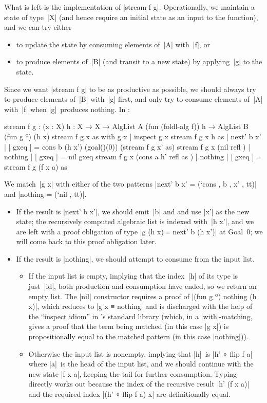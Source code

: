 What is left is the implementation of |stream f g|.
Operationally, we maintain a state of type~|X| (and hence require an initial state as an input to the function), and we can try either
\begin{itemize}
\item to update the state by consuming elements of~|A| with~|f|, or
\item to produce elements of~|B| (and transit to a new state) by applying~|g| to the state.
\end{itemize}
Since we want |stream f g| to be as productive as possible, we should always try to produce elements of~|B| with~|g| first, and only try to consume elements of~|A| with~|f| when |g|~produces nothing.
In \Agda:
\begin{code}
stream f g :  (x : X) {h : X → X} →
              AlgList A (fun (foldl-alg f)) h → AlgList B (fun g º) (h x)
stream f g x      as                      with g x      | inspect g x
stream f g x {h}  as                      | next' b x'  | [ gxeq ] =  cons b (h x') (goal()(0))
                                                                        (stream f g x' as)
stream f g x      (nil        refl     )  | nothing     | [ gxeq ] =  nil gxeq
stream f g x      (cons a h'  refl as  )  | nothing     | [ gxeq ] =  stream f g (f x a) as
\end{code}
We match~|g x| with either of the two patterns |next' b x' = (`cons , b , x' , tt)| and |nothing = (`nil , tt)|.
\begin{itemize}
\item If the result is |next' b x'|, we should emit~|b| and and use |x'| as the new state; the recursively computed algebraic list is indexed with~|h x'|, and we are left with a proof obligation of type |g (h x) ≡ next' b (h x')| at Goal~0; we will come back to this proof obligation later.
\item If the result is |nothing|, we should attempt to consume from the input list.
\begin{itemize}
\item If the input list is empty, implying that the index~|h| of its type is just~|id|, both production and consumption have ended, so we return an empty list.
The |nil| constructor requires a proof of |(fun g º) nothing (h x)|, which reduces to |g x ≡ nothing| and is discharged with the help of the ``inspect idiom'' in \Agda's standard library (which, in a |with|-matching, gives a proof that the term being matched (in this case |g x|) is propositionally equal to the matched pattern (in this case |nothing|)).
\item Otherwise the input list is nonempty, implying that |h|~is |h' ∘ flip f a| where |a|~is the head of the input list, and we should continue with the new state |f x a|, keeping the tail for further consumption.
Typing directly works out because the index of the recursive result |h' (f x a)| and the required index |(h' ∘ flip f a) x| are definitionally equal.
\end{itemize}
\end{itemize}

